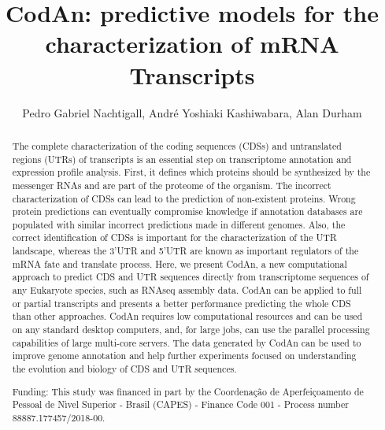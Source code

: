 \documentclass[twoside]{article}
\title{\vspace{-15mm}\fontsize{24pt}{10pt}\selectfont\textbf{ CodAn: predictive models for the characterization of mRNA Transcripts }} %
\author{ Pedro Gabriel Nachtigall, Andr\'e Yoshiaki Kashiwabara, Alan Durham }
\affil{ Laborat\'orio Especial de Toxinologia Aplicada (LETA),  Instituto Butantan,  S\~ao Paulo,  Brazil }
\date{}
\begin{document}
  
  
  \maketitle %
  
  
  \thispagestyle{fancy} %
  
  
  \begin{abstract}
  The complete characterization of the coding sequences (CDSs) and untranslated regions (UTRs) of transcripts is an essential step on transcriptome annotation and expression profile analysis. First,  it defines which proteins should be synthesized by the messenger RNAs and are part of the proteome of the organism. The incorrect characterization of CDSs can lead to the prediction of non-existent proteins. Wrong protein predictions can eventually compromise knowledge if annotation databases are populated with similar incorrect predictions made in different genomes. Also,  the correct identification of CDSs is important for the characterization of the UTR landscape,  whereas the 3’UTR and 5’UTR are known as important regulators of the mRNA fate and translate process. Here,  we present CodAn,  a new computational approach to predict CDS and UTR sequences directly from transcriptome sequences of any Eukaryote species,  such as RNAseq assembly data. CodAn can be applied to full or partial transcripts and presents a better performance predicting the whole CDS than other approaches. CodAn requires low computational resources and can be used on any standard desktop computers,  and,  for large jobs,  can use the parallel processing capabilities of large multi-core servers. The data generated by CodAn can be used to improve genome annotation and help further experiments focused on understanding the evolution and biology of CDS and UTR sequences.
  
  Funding: This study was financed in part by the Coordena\c{c}\~ao de Aperfei\c{c}oamento de Pessoal de N\'{\i}vel Superior - Brasil (CAPES) - Finance Code 001 - Process number 88887.177457/2018-00. \\ 
  \end{abstract}
  
\end{document}

